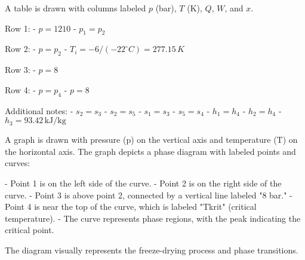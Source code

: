 A table is drawn with columns labeled \( p \) (bar), \( T \) (K), \( Q \), \( W \), and \( x \).  

Row 1:  
- \( p = 1210 \)  
- \( p_1 = p_2 \)  

Row 2:  
- \( p = p_2 \)  
- \( T_i = -6 / (-22^\circ C) = 277.15 \, K \)  

Row 3:  
- \( p = 8 \)  

Row 4:  
- \( p = p_4 \)  
- \( p = 8 \)  

Additional notes:  
- \( s_2 = s_3 \)  
- \( s_2 = s_5 \)  
- \( s_1 = s_3 \)  
- \( s_5 = s_4 \)  
- \( h_1 = h_4 \)  
- \( h_2 = h_4 \)  
- \( h_3 = 93.42 \, \text{kJ/kg} \)

A graph is drawn with pressure (p) on the vertical axis and temperature (T) on the horizontal axis. The graph depicts a phase diagram with labeled points and curves:  

- Point 1 is on the left side of the curve.  
- Point 2 is on the right side of the curve.  
- Point 3 is above point 2, connected by a vertical line labeled "8 bar."  
- Point 4 is near the top of the curve, which is labeled "Tkrit" (critical temperature).  
- The curve represents phase regions, with the peak indicating the critical point.  

The diagram visually represents the freeze-drying process and phase transitions.